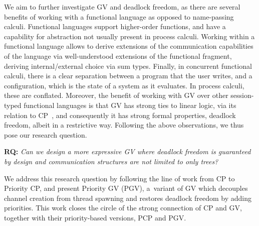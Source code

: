 \documentclass[main.tex]{subfiles}
\begin{document}
We aim to further investigate GV and deadlock freedom, as there are several benefits of working with a functional language as opposed to name-passing calculi. Functional languages support higher-order functions, and have a capability for abstraction not usually present in process calculi. Working within a functional language allows to derive extensions of the communication capabilities of the language via well-understood extensions of the functional fragment, \ie deriving internal/external choice via sum types. Finally, in concurrent functional calculi, there is a clear separation between a program that the user writes, and a configuration, which is the state of a system as it evaluates. In process calculi, these are conflated.
Moreover, the benefit of working with GV over other session-typed functional languages is that GV has strong ties to linear logic, via its relation to CP~\cite{wadler14}, and consequently it has strong formal properties, \eg deadlock freedom, albeit in a restrictive way.
Following the above observations, we thus pose our research question.

\textbf{RQ:} \emph{Can we design a more expressive GV where deadlock freedom is guaranteed by design and communication structures are not limited to only trees?}

We address this research question by following the line of work from CP to Priority CP, and present
Priority GV (PGV), a~variant of GV which decouples channel creation from thread spawning and restores deadlock freedom by adding priorities. This work closes the circle of the strong connection of CP and GV, together with their priority-based versions, PCP and PGV.
\end{document}
